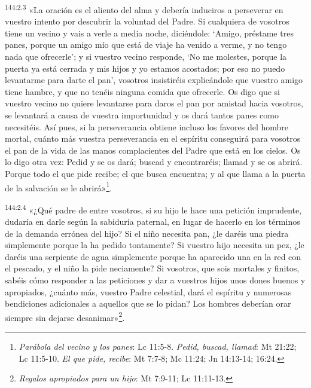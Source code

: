 \par 
\textsuperscript{144:2.3} «La oración es el aliento del alma y debería induciros a perseverar en vuestro intento por descubrir la voluntad del Padre. Si cualquiera de vosotros tiene un vecino y vais a verle a media noche, diciéndole: `Amigo, préstame tres panes, porque un amigo mío que está de viaje ha venido a verme, y no tengo nada que ofrecerle'; y si vuestro vecino responde, `No me molestes, porque la puerta ya está cerrada y mis hijos y yo estamos acostados; por eso no puedo levantarme para darte el pan', vosotros insistiréis explicándole que vuestro amigo tiene hambre, y que no tenéis ninguna comida que ofrecerle. Os digo que si vuestro vecino no quiere levantarse para daros el pan por amistad hacia vosotros, se levantará a causa de vuestra importunidad y os dará tantos panes como necesitéis. Así pues, si la perseverancia obtiene incluso los favores del hombre mortal, cuánto más vuestra perseverancia en el espíritu conseguirá para vosotros el pan de la vida de las manos complacientes del Padre que está en los cielos. Os lo digo otra vez: Pedid y se os dará; buscad y encontraréis; llamad y se os abrirá. Porque todo el que pide recibe; el que busca encuentra; y al que llama a la puerta de la salvación se le abrirá»\footnote{\textit{Parábola del vecino y los panes}: Lc 11:5-8. \textit{Pedid, buscad, llamad}: Mt 21:22; Lc 11:5-10. \textit{El que pide, recibe}: Mt 7:7-8; Mc 11:24; Jn 14:13-14; 16:24.}.

\par 
\textsuperscript{144:2.4} «¿Qué padre de entre vosotros, si su hijo le hace una petición imprudente, dudaría en darle según la sabiduría paternal, en lugar de hacerlo en los términos de la demanda errónea del hijo? Si el niño necesita pan, ¿le daréis una piedra simplemente porque la ha pedido tontamente? Si vuestro hijo necesita un pez, ¿le daréis una serpiente de agua simplemente porque ha aparecido una en la red con el pescado, y el niño la pide neciamente? Si vosotros, que sois mortales y finitos, sabéis cómo responder a las peticiones y dar a vuestros hijos unos dones buenos y apropiados, ¿cuánto más, vuestro Padre celestial, dará el espíritu y numerosas bendiciones adicionales a aquellos que se lo pidan? Los hombres deberían orar siempre sin dejarse desanimar»\footnote{\textit{Regalos apropiados para un hijo}: Mt 7:9-11; Lc 11:11-13.}.

